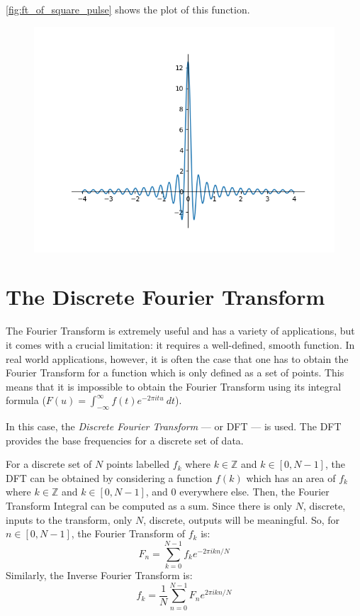 \documentclass [12pt, titlepage]{article}
\numberwithin{equation}{section}
\let\oldsection\section
\renewcommand\section{\clearpage\oldsection}
\newcommand{\infint}{\int_{-\infty}^{\infty}} %
\begin{document}
\autoref{fig:ft_of_square_pulse} shows the plot of this function.
\begin{figure}[H]
    \centering
    \includegraphics[width=.6\textwidth]{ft_of_square_pulse}
    \caption{}
    \label{fig:ft_of_square_pulse}
\end{figure}


\section{The Discrete Fourier Transform}

The Fourier Transform is extremely useful and has a variety of applications, but it comes
with a crucial limitation: it requires a well-defined, smooth function.
\autocite[319]{courant_calculus_2} In real world applications, however, it is often the case
that one has to obtain the Fourier Transform for a function which is only defined as a set
of points. This means that it is impossible to obtain the Fourier Transform using its
integral formula ($F(u) = \infint f(t) e^{-2\pi itu}\ dt$). 

In this case, the \emph{Discrete Fourier Transform} --- or DFT --- is used. The DFT provides
the base frequencies for a discrete set of data. 

For a discrete set of $N$ points labelled $f_k$ where $k \in \mathbb{Z}$ and $k \in [0,
N-1]$, the DFT can be obtained by considering a function $f(k)$ which has an area of $f_k$
where $k \in \mathbb{Z}$ and $k \in [0, N-1]$, and 0 everywhere else. Then, the Fourier
Transform Integral can be computed as a sum. Since there is only $N$, discrete, inputs to the
transform, only $N$, discrete, outputs will be meaningful. So, for $n \in [0, N-1]$, the
Fourier Transform of $f_k$ is:
%
\begin{equation}
    F_n = \sum_{k=0}^{N-1} f_k e^{-2\pi ikn / N}
\end{equation}
%
Similarly, the Inverse Fourier Transform is:
%
\begin{equation}
    f_k = \frac{1}{N} \sum_{n=0}^{N-1} F_n e^{2\pi ikn / N}
\end{equation}
%
\end{document}
